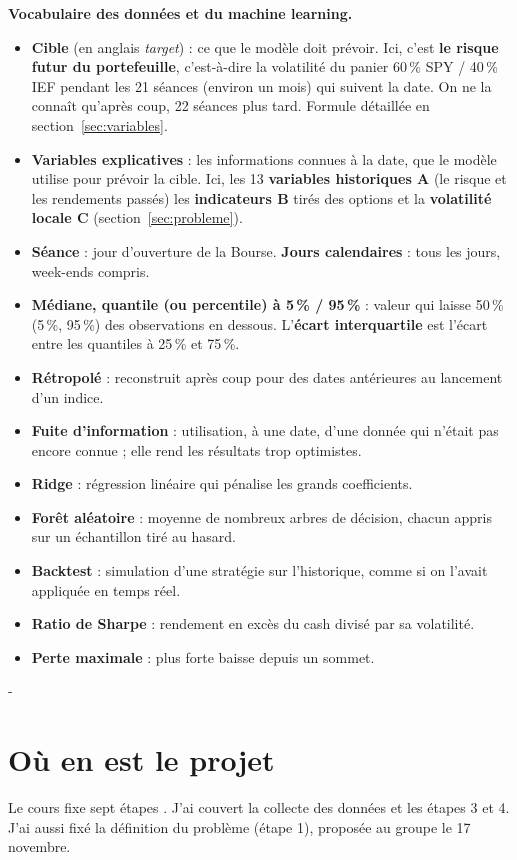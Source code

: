 \documentclass[10pt,a4paper]{article}
\makeatletter
\newcommand{\besoin}[1]{\par\penalty-100\begingroup\setlength{\dimen@}{#1}%
  \dimen@ii\pagegoal\advance\dimen@ii-\pagetotal
  \ifdim\dimen@>\dimen@ii\ifdim\dimen@ii>\z@\vfil\fi\break\fi\endgroup}
\let\sectionorigine\section
\renewcommand{\section}{\besoin{6\baselineskip}\sectionorigine}
\makeatother
\begin{document}
\textbf{Vocabulaire des données et du machine learning.}
\begin{itemize}
\item \textbf{Cible} (en anglais \emph{target}) : ce que le modèle doit prévoir. Ici, c'est \textbf{le risque futur du portefeuille}, c'est-à-dire la volatilité du panier 60\,\% SPY / 40\,\% IEF pendant les 21 séances (environ un mois) qui suivent la date. On ne la connaît qu'après coup, 22 séances plus tard. Formule détaillée en section~\ref{sec:variables}.
\item \textbf{Variables explicatives} : les informations connues à la date, que le modèle utilise pour prévoir la cible. Ici, les 13 \textbf{variables historiques A} (le risque et les rendements passés) les \textbf{indicateurs B} tirés des options et la \textbf{volatilité locale C} (section~\ref{sec:probleme}).
\item \textbf{Séance} : jour d'ouverture de la Bourse. \textbf{Jours calendaires} : tous les jours, week-ends compris.
\item \textbf{Médiane, quantile (ou percentile) à 5\,\% / 95\,\%} : valeur qui laisse 50\,\% (5\,\%, 95\,\%) des observations en dessous. L'\textbf{écart interquartile} est l'écart entre les quantiles à 25\,\% et 75\,\%.
\item \textbf{Rétropolé} : reconstruit après coup pour des dates antérieures au lancement d'un indice.
\item \textbf{Fuite d'information} : utilisation, à une date, d'une donnée qui n'était pas encore connue ; elle rend les résultats trop optimistes.
\item \textbf{Ridge} : régression linéaire qui pénalise les grands coefficients.
\item \textbf{Forêt aléatoire} : moyenne de nombreux arbres de décision, chacun appris sur un échantillon tiré au hasard.
\item \textbf{Backtest} : simulation d'une stratégie sur l'historique, comme si on l'avait appliquée en temps réel.
\item \textbf{Ratio de Sharpe} : rendement en excès du cash divisé par sa volatilité.
\item \textbf{Perte maximale} : plus forte baisse depuis un sommet.
\end{itemize}

\section{Où en est le projet}
Le cours fixe sept étapes \cite{cours6}. J'ai couvert la collecte des données et les étapes 3 et 4. J'ai aussi fixé la définition du problème (étape 1), proposée au groupe le 17 novembre.
\end{document}

